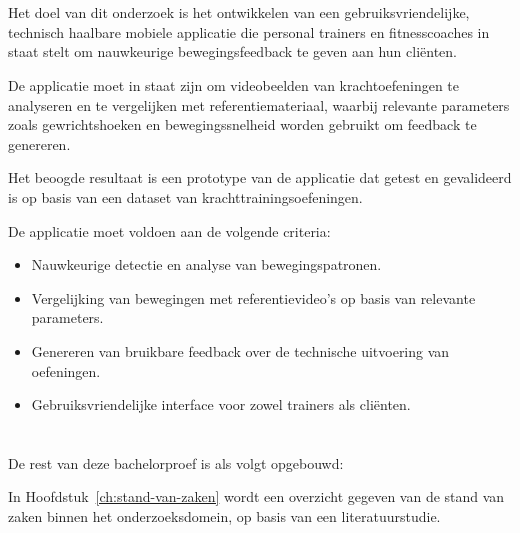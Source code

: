 \section{}%
\label{sec:onderzoeksdoelstelling}

Het doel van dit onderzoek is het ontwikkelen van een gebruiksvriendelijke, \mbox{technisch} haalbare mobiele applicatie die personal trainers en fitnesscoaches in staat stelt om nauwkeurige bewegingsfeedback te geven aan hun cliënten. 

\medskip

De applicatie moet in staat zijn om videobeelden van krachtoefeningen te analyseren en te vergelijken met referentiemateriaal, waarbij relevante parameters zoals gewrichtshoeken en bewegingssnelheid worden gebruikt om feedback te genereren.

\medskip

Het beoogde resultaat is een prototype van de applicatie dat getest en gevalideerd is op basis van een dataset van krachttrainingsoefeningen. 

\medskip

De applicatie moet voldoen aan de volgende criteria:
\begin{itemize}
    \item Nauwkeurige detectie en analyse van bewegingspatronen.
    \item Vergelijking van bewegingen met referentievideo’s op basis van relevante parameters.
    \item Genereren van bruikbare feedback over de technische uitvoering van oefeningen.
    \item Gebruiksvriendelijke interface voor zowel trainers als cliënten.
\end{itemize}

\section{}%
\label{sec:opzet-bachelorproef}


De rest van deze bachelorproef is als volgt opgebouwd:

In Hoofdstuk~\ref{ch:stand-van-zaken} wordt een overzicht gegeven van de stand van zaken binnen het onderzoeksdomein, op basis van een literatuurstudie.

